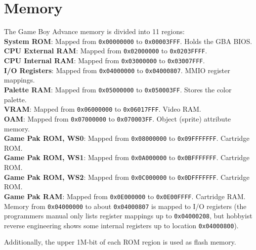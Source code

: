 \documentclass[11pt,a4paper,draft]{article}
\begin{document}
	
	
	\section{Memory}
	The Game Boy Advance memory is divided into 11 regions:\\
	\textbf{System ROM}: Mapped from \texttt{0x00000000} to \texttt{0x00003FFF}. Holds the GBA BIOS.\\
	\textbf{CPU External RAM}: Mapped from \texttt{0x02000000} to \texttt{0x0203FFFF}.\\
	\textbf{CPU Internal RAM}: Mapped from \texttt{0x03000000} to \texttt{0x03007FFF}.\\
	\textbf{I/O Registers}: Mapped from \texttt{0x04000000} to \texttt{0x04000807}. MMIO register mappings.\\
	\textbf{Palette RAM}: Mapped from \texttt{0x05000000} to \texttt{0x050003FF}. Stores the color palette.\\
	\textbf{VRAM}: Mapped from \texttt{0x06000000} to \texttt{0x06017FFF}. Video RAM.\\
	\textbf{OAM}: Mapped from \texttt{0x07000000} to \texttt{0x070003FF}. Object (sprite) attribute memory.\\
	\textbf{Game Pak ROM, WS0}: Mapped from \texttt{0x08000000} to \texttt{0x09FFFFFFF}. Cartridge ROM.\\
	\textbf{Game Pak ROM, WS1}: Mapped from \texttt{0x0A000000} to \texttt{0x0BFFFFFFF}. Cartridge ROM.\\
	\textbf{Game Pak ROM, WS2}: Mapped from \texttt{0x0C000000} to \texttt{0x0DFFFFFFF}. Cartridge ROM.\\
	\textbf{Game Pak RAM}: Mapped from \texttt{0x0E000000} to \texttt{0x0E00FFFF}. Cartridge RAM.\cite{GBAManual}\\
	
	Memory from \texttt{0x04000000} to about \texttt{0x04000807} is mapped to I/O registers (the programmers manual only lists register mappings up to \texttt{0x04000208}, but hobbyist reverse engineering shows some internal registers up to location \texttt{0x04000800}).
	
	
	Additionally, the upper 1M-bit of each ROM region is used as flash memory.
	
\end{document}

